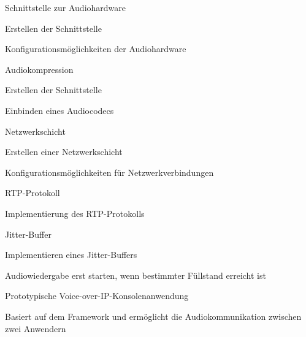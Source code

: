 \begin{compactenum}[a)]
	\item Schnittstelle zur Audiohardware \label{FA:SchnittstelleAudiohardware}
		\begin{compactenum}[1.]
			\item Erstellen der Schnittstelle \label{FA:SchnittstelleAudiohardware:Erstellen}
			\item Konfigurationsmöglichkeiten der Audiohardware \label{FA:SchnittstelleAudiohardware:Konfigurieren}
		\end{compactenum}
	\item Audiokompression \label{FA:Audiokompression}
		\begin{compactenum}[1.]
			\item Erstellen der Schnittstelle \label{Fa:Audiokompression:Erstellen}
			\item Einbinden eines Audiocodecs \label{Fa:Audiokompression:CodecEinbinden}
		\end{compactenum}
	\item Netzwerkschicht \label{Fa:Netzwerkschicht}
		\begin{compactenum}[1.]
			\item Erstellen einer Netzwerkschicht \label{Fa:Netzwerkschicht:Erstellen}
			\item Konfigurationsmöglichkeiten für Netzwerkverbindungen \label{FA:Netzwerkschicht:Konfigurieren}
		\end{compactenum}
	\item RTP-Protokoll \label{FA:RTP}
		\begin{compactenum}[1.]
			\item Implementierung des RTP-Protokolls \label{FA:RTP:Implementieren}
		\end{compactenum}
	\item Jitter-Buffer \label{FA:Jitter-Buffer}
		\begin{compactenum}[1.]
			\item Implementieren eines Jitter-Buffers \label{FA:Jitter-Buffer:Implementieren}
			\item Audiowiedergabe erst starten, wenn bestimmter Füllstand erreicht ist \label{FA:Jitter-Buffer:Buffern}
		\end{compactenum}
	\item Prototypische Voice-over-IP-Konsolenanwendung \label{FA:Konsolenanwendung}
		\begin{compactenum}[1.]
			\item Basiert auf dem Framework und ermöglicht die Audiokommunikation zwischen zwei Anwendern \label{FA:Konsolenanwendung:Audiokommunikation}

\end{compactenum}
\end{compactenum}
